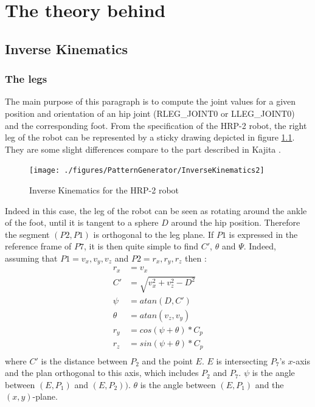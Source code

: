 \chapter{The theory behind}

\section{Inverse Kinematics}
\subsection{The legs}
The main purpose of this paragraph is to compute the joint values
for a given position and orientation of an hip joint (RLEG\_JOINT0
or LLEG\_JOINT0) and the corresponding foot.
From the specification of the HRP-2 robot, the right leg of the robot
can be represented by a sticky drawing depicted in figure \ref{pic:InverseKinematicsforHRP2}.
They are some slight differences compare to the part described in Kajita \cite{Kajita2005}.
%
\begin{figure}[htb]
\begin{center}
\texttt{[image: ./figures/PatternGenerator/InverseKinematics2]}
\caption{Inverse Kinematics for the HRP-2 robot}
\label{pic:InverseKinematicsforHRP2}
\end{center}
\end{figure}
%
Indeed in this case, the leg of the robot can be seen as rotating around the ankle of the foot,
until it is tangent to a sphere $D$ around the hip position.
Therefore the segment  $(P2,P1)$ is orthogonal to the leg plane.
If $P1$ is expressed in the reference frame of $P7$, it is then
quite simple to find $C'$, $\theta$ and $\Psi$.
Indeed, assuming that $P1= { v_x, v_y, v_z}$ and $P2 = {r_x, r_y, r_z}$ then :
\begin{equation}
\begin{aligned}
r_x &= v_x \\
C' &= \sqrt{v_x^2 + v_z^2 - D^2} \\
\psi &= atan(D,C') \\
\theta &= atan(v_z, v_y) \\
r_y &= cos(\psi+\theta) *C_p \\
r_z &= sin(\psi+\theta) *C_p \\
\end{aligned}
\end{equation}
where $C'$ is the distance between $P_2$ and the point $E$. $E$ is intersecting $P_7$'s $x$-axis and
the plan orthogonal to this axis, which includes $P_2$ and $P_7$.
$\psi$ is the angle between $(E, P_1)$ and $(E,P_2))$.
$\theta$ is the angle between $(E,P_1)$ and the $(x,y)$-plane.

